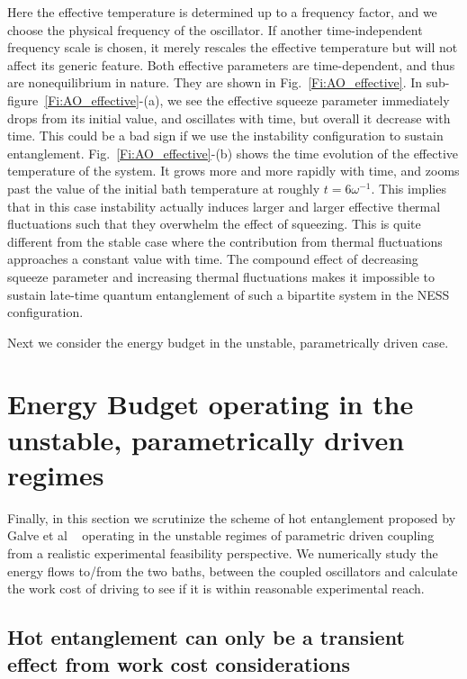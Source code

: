 \documentclass[11pt,a4paper]{article}
\begin{document}
Here the effective temperature is determined up to a frequency factor, and we choose the physical frequency of the oscillator. If another time-independent frequency scale is chosen, it merely rescales the effective temperature but will not affect its generic feature. Both effective parameters are time-dependent, and thus are nonequilibrium in nature. They are shown in Fig.~\ref{Fi:AO_effective}. In sub-figure~\ref{Fi:AO_effective}-(a), we see the effective squeeze parameter immediately drops from its initial value, and oscillates with time, but overall it decrease with time. This could be a bad sign if we use the instability configuration to sustain entanglement. Fig.~\ref{Fi:AO_effective}-(b) shows the time evolution of the effective temperature of the system. It grows more and more rapidly with time, and zooms past the value of the initial bath temperature at roughly $t=6\omega^{-1}$. This implies that in this case instability actually induces larger and larger effective thermal fluctuations {such that they overwhelm} the effect of squeezing. This is quite different from the stable case where the contribution from thermal fluctuations approaches a constant value with time.  The compound effect of decreasing squeeze parameter and increasing thermal fluctuations makes it impossible to sustain late-time quantum entanglement of such a bipartite system in the NESS configuration.







 
Next we consider the energy budget in the unstable, parametrically driven case.
 

\section{Energy Budget operating in the unstable, parametrically driven regimes}\label{S:ebgdfhg}

Finally, in this section we scrutinize the scheme of hot entanglement proposed by Galve et al ~\cite{galve-prl} operating in the unstable regimes of parametric driven coupling from a realistic experimental feasibility perspective. We numerically study the energy flows to/from the two baths, between the coupled oscillators and calculate the work cost of driving to see if it is within reasonable experimental reach.  

\subsection{Hot entanglement can only be a transient effect from work cost considerations}
\end{document}
